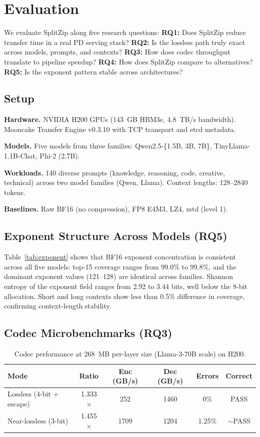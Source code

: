 \section{Evaluation}
\label{sec:eval}

We evaluate SplitZip along five research questions:
\textbf{RQ1:} Does SplitZip reduce transfer time in a real PD serving stack?
\textbf{RQ2:} Is the lossless path truly exact across models, prompts, and contexts?
\textbf{RQ3:} How does codec throughput translate to pipeline speedup?
\textbf{RQ4:} How does SplitZip compare to alternatives?
\textbf{RQ5:} Is the exponent pattern stable across architectures?

\subsection{Setup}

\textbf{Hardware.} NVIDIA H200 GPUs (143~GB HBM3e, 4.8~TB/s bandwidth). Mooncake Transfer Engine v0.3.10 with TCP transport and etcd metadata.

\textbf{Models.} Five models from three families: Qwen2.5-\{1.5B, 3B, 7B\}, TinyLlama-1.1B-Chat, Phi-2 (2.7B).

\textbf{Workloads.} 140 diverse prompts (knowledge, reasoning, code, creative, technical) across two model families (Qwen, Llama). Context lengths: 128--2840 tokens.

\textbf{Baselines.} Raw BF16 (no compression), FP8 E4M3, LZ4, zstd (level 1).

\subsection{Exponent Structure Across Models (RQ5)}

Table~\ref{tab:exponent} shows that BF16 exponent concentration is consistent across all five models: top-15 coverage ranges from 99.0\% to 99.8\%, and the dominant exponent values (121--128) are identical across families. Shannon entropy of the exponent field ranges from 2.92 to 3.44 bits, well below the 8-bit allocation. Short and long contexts show less than 0.5\% difference in coverage, confirming context-length stability.

\subsection{Codec Microbenchmarks (RQ3)}

\begin{table}[t]
\centering
\small
\caption{Codec performance at 268~MB per-layer size (Llama-3-70B scale) on H200.}
\label{tab:codec}
\begin{tabular}{lccccc}
\toprule
Mode & Ratio & Enc (GB/s) & Dec (GB/s) & Errors & Correct \\
\midrule
Lossless (4-bit + escape) & 1.333$\times$ & 252 & 1460 & 0\% & PASS \\
Near-lossless (3-bit) & 1.455$\times$ & 1709 & 1204 & 1.25\% & $\sim$PASS \\
\bottomrule
\end{tabular}
\end{table}

